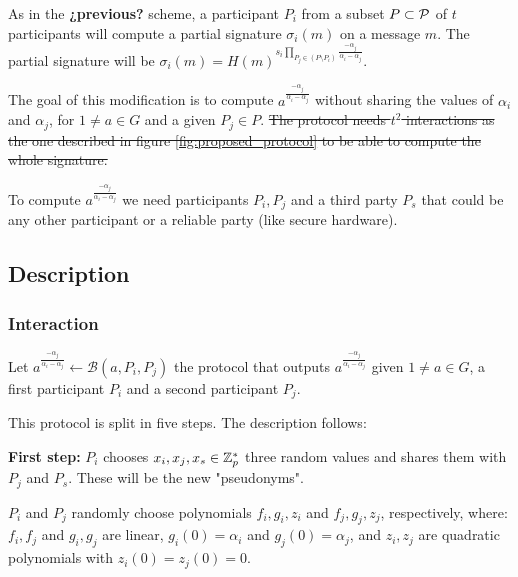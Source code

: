 As in the \textbf{¿previous?} scheme, a participant $P_i$ from a subset $P \subset {\mathcal P}$ of $t$ participants will compute a partial signature $\sigma_i (m)$ on a message $m$. The partial signature will be $\sigma_i (m) = H(m)^{s_i \prod_{P_j \in (P \setminus P_i)} \frac{-\alpha_j}{\alpha_i - \alpha_j}}$.

The goal of this modification is to compute $a^\frac{-\alpha_j}{\alpha_i - \alpha_j}$ without sharing the values of $\alpha_i$ and $\alpha_j$, for $1 \neq a \in G$ and a given $P_j \in P$. \sout{The protocol needs $t^2$ interactions as the one described in figure \ref{fig:proposed_protocol} to be able to compute the whole signature.}

To compute $a^\frac{-\alpha_j}{\alpha_i - \alpha_j}$ we need participants $P_i,P_j$ and a third party $P_s$ that could be any other participant or a reliable party (like secure hardware).

\subsection{Description}
\subsubsection*{Interaction}
Let $a^{\frac{-\alpha_j}{\alpha_i - \alpha_j}} \leftarrow \mathcal{B}(a,P_i,P_j)$ the protocol that outputs $a^{\frac{-\alpha_j}{\alpha_i - \alpha_j}}$ given $1 \neq a \in G$, a first participant $P_i$ and a second participant $P_j$.

This protocol is split in five steps. The description follows:

\textbf{First step:} $P_i$ chooses $x_i, x_j, x_s \in {\mathbb Z}^*_p$ three random values and shares them with $P_j$ and $P_s$. These will be the new "pseudonyms".

$P_i$ and $P_j$ randomly choose polynomials $f_i, g_i, z_i$ and $f_j, g_j, z_j$, respectively, where: $f_i,f_j$ and $g_i,g_j$ are linear, $g_i(0) = \alpha_i$ and $g_j(0) = \alpha_j$, and $z_i,z_j$ are quadratic polynomials with $z_i(0) = z_j(0) = 0$.

